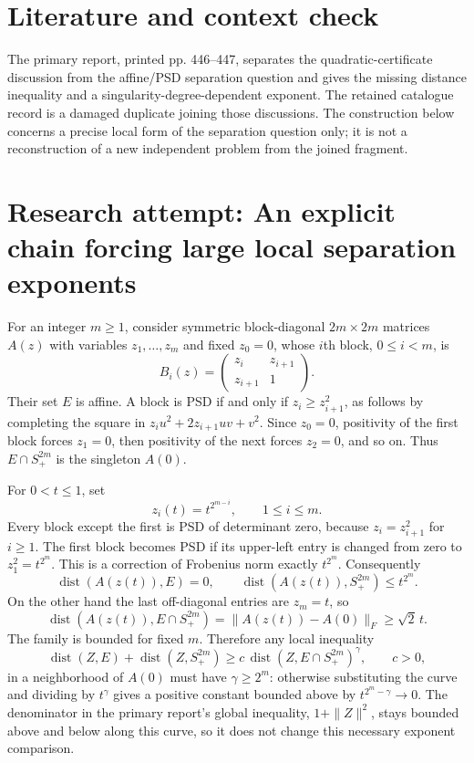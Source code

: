 \documentclass[11pt]{article}
\begin{document}
\section{Literature and context check}
The primary report, printed pp. 446--447, separates the quadratic-certificate discussion from the affine/PSD separation question and gives the missing distance inequality and a singularity-degree-dependent exponent. The retained catalogue record is a damaged duplicate joining those discussions. The construction below concerns a precise local form of the separation question only; it is not a reconstruction of a new independent problem from the joined fragment.
\section{Research attempt: An explicit chain forcing large local separation exponents}

For an integer $m\geq1$, consider symmetric block-diagonal $2m\times2m$ matrices $A(z)$ with variables $z_1,\ldots,z_m$ and fixed $z_0=0$, whose $i$th block, $0\leq i<m$, is
\[
B_i(z)=\begin{pmatrix}z_i&z_{i+1}\\z_{i+1}&1\end{pmatrix}.
\]
Their set $E$ is affine. A block is PSD if and only if $z_i\geq z_{i+1}^2$, as follows by completing the square in $z_i u^2+2z_{i+1}uv+v^2$. Since $z_0=0$, positivity of the first block forces $z_1=0$, then positivity of the next forces $z_2=0$, and so on. Thus $E\cap S_+^{2m}$ is the singleton $A(0)$.

For $0<t\leq1$, set
\[
z_i(t)=t^{2^{m-i}},\qquad 1\leq i\leq m.
\]
Every block except the first is PSD of determinant zero, because $z_i=z_{i+1}^2$ for $i\geq1$. The first block becomes PSD if its upper-left entry is changed from zero to $z_1^2=t^{2^m}$. This is a correction of Frobenius norm exactly $t^{2^m}$. Consequently
\[
\operatorname{dist}(A(z(t)),E)=0,\qquad
\operatorname{dist}(A(z(t)),S_+^{2m})\leq t^{2^m}.
\]
On the other hand the last off-diagonal entries are $z_m=t$, so
\[
\operatorname{dist}(A(z(t)),E\cap S_+^{2m})
=\|A(z(t))-A(0)\|_F\geq\sqrt2\,t.
\]
The family is bounded for fixed $m$. Therefore any local inequality
\[
\operatorname{dist}(Z,E)+\operatorname{dist}(Z,S_+^{2m})
\geq c\,\operatorname{dist}(Z,E\cap S_+^{2m})^\gamma,
\qquad c>0,
\]
in a neighborhood of $A(0)$ must have $\gamma\geq2^m$: otherwise substituting the curve and dividing by $t^\gamma$ gives a positive constant bounded above by $t^{2^m-\gamma}\to0$. The denominator in the primary report's global inequality, $1+\|Z\|^2$, stays bounded above and below along this curve, so it does not change this necessary exponent comparison.
\end{document}
